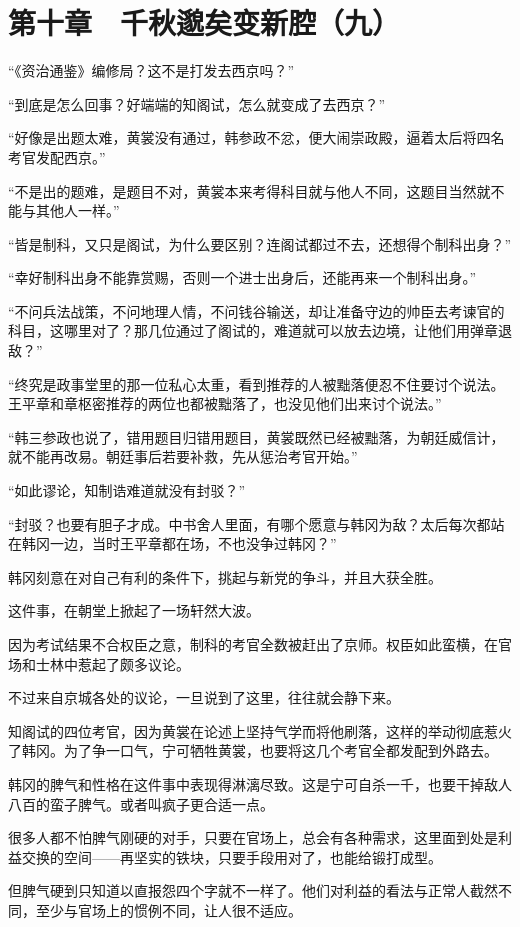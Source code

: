 \section{第十章　千秋邈矣变新腔（九）}

“《资治通鉴》编修局？这不是打发去西京吗？”

“到底是怎么回事？好端端的知阁试，怎么就变成了去西京？”

“好像是出题太难，黄裳没有通过，韩参政不忿，便大闹崇政殿，逼着太后将四名考官发配西京。”

“不是出的题难，是题目不对，黄裳本来考得科目就与他人不同，这题目当然就不能与其他人一样。”

“皆是制科，又只是阁试，为什么要区别？连阁试都过不去，还想得个制科出身？”

“幸好制科出身不能靠赏赐，否则一个进士出身后，还能再来一个制科出身。”

“不问兵法战策，不问地理人情，不问钱谷输送，却让准备守边的帅臣去考谏官的科目，这哪里对了？那几位通过了阁试的，难道就可以放去边境，让他们用弹章退敌？”

“终究是政事堂里的那一位私心太重，看到推荐的人被黜落便忍不住要讨个说法。王平章和章枢密推荐的两位也都被黜落了，也没见他们出来讨个说法。”

“韩三参政也说了，错用题目归错用题目，黄裳既然已经被黜落，为朝廷威信计，就不能再改易。朝廷事后若要补救，先从惩治考官开始。”

“如此谬论，知制诰难道就没有封驳？”

“封驳？也要有胆子才成。中书舍人里面，有哪个愿意与韩冈为敌？太后每次都站在韩冈一边，当时王平章都在场，不也没争过韩冈？”

韩冈刻意在对自己有利的条件下，挑起与新党的争斗，并且大获全胜。

这件事，在朝堂上掀起了一场轩然大波。

因为考试结果不合权臣之意，制科的考官全数被赶出了京师。权臣如此蛮横，在官场和士林中惹起了颇多议论。

不过来自京城各处的议论，一旦说到了这里，往往就会静下来。

知阁试的四位考官，因为黄裳在论述上坚持气学而将他刷落，这样的举动彻底惹火了韩冈。为了争一口气，宁可牺牲黄裳，也要将这几个考官全都发配到外路去。

韩冈的脾气和性格在这件事中表现得淋漓尽致。这是宁可自杀一千，也要干掉敌人八百的蛮子脾气。或者叫疯子更合适一点。

很多人都不怕脾气刚硬的对手，只要在官场上，总会有各种需求，这里面到处是利益交换的空间——再坚实的铁块，只要手段用对了，也能给锻打成型。

但脾气硬到只知道以直报怨四个字就不一样了。他们对利益的看法与正常人截然不同，至少与官场上的惯例不同，让人很不适应。

